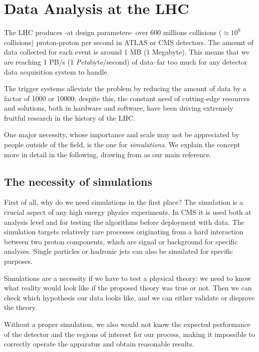 \chapter{Data Analysis at the LHC}\label{ch:introduction}
The LHC produces -at design parameters- over 600 millions collisions ($\approx 10^9$ collisions) proton-proton per second in ATLAS or CMS detectors. The amount of data collected for each event is around 1 MB (1 Megabyte). This means that we are reaching 1 PB/s (1 \emph{Peta}byte/second) of data--far too much for any detector data acquisition system to handle.

The trigger systems alleviate the problem by reducing the amount of data by a factor of 1000 or 10000; despite this, the constant need of cutting-edge resources and solutions, both in hardware and software, have been driving extremely fruitful research in the history of the LHC.

One major necessity, whose importance and scale may not be appreciated by people outside of the field, is the one for \emph{simulations}. We explain the concept more in detail in the following, drawing from \cite{sims} as our main reference.

\section{The necessity of simulations}

First of all, why do we need simulations in the first place?
The simulation is a crucial aspect of any high energy physics experiments. In CMS it is used both
at analysis level and for testing the algorithms before deployment with data. The simulation targets relatively rare processes originating from a hard interaction between two
proton components, which are signal or background for specific analyses. Single particles
or hadronic jets can also be simulated for specific purposes.

Simulations are a necessity if we have to test a physical theory: we need to know what reality would look like if the proposed theory was true or not. Then we can check which hypothesis our data looks like, and we can either validate or disprove the theory.

Without a proper simulation, we also would not know the expected performance of the detector and the regions of interest for our process, making it impossible to correctly operate the apparatus and obtain reasonable results.

